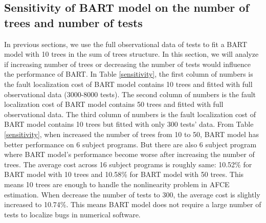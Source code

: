 \subsection{Sensitivity of BART model on the number of trees and number of tests}\label{BARTsensitivity}

In previous sections, we use the full observational data of tests to fit a BART model with 10 trees in the sum of trees structure. In this section, we will analyze if increasing number of trees or decreasing the number of tests would influence the performance of BART. In Table \ref{sensitivity}, the first column of numbers is the fault localization cost of BART model contains 10 trees and fitted with full observational data (3000-8000 tests). The second column of numbers is the fault localization cost of BART model contains 50 trees and fitted with full observational data. The third column of numbers is the fault localization cost of BART model contains 10 trees but fitted with only 300 tests' data. From Table \ref{sensitivity}, when increased the number of trees from 10 to 50, BART model has better performance on 6 subject programs. But there are also 6 subject program where BART model's performance become worse after increasing the number of trees. The average cost across 16 subject programs is roughly same: 10.52\% for BART model with 10 trees and 10.58\% for BART model with 50 trees. This means 10 trees are enough to handle the nonlinearity problem in AFCE estimation.  When decrease the number of tests to 300, the average cost is slightly increased to 10.74\%.  This means BART model does not require a large number of tests to localize bugs in numerical software.

